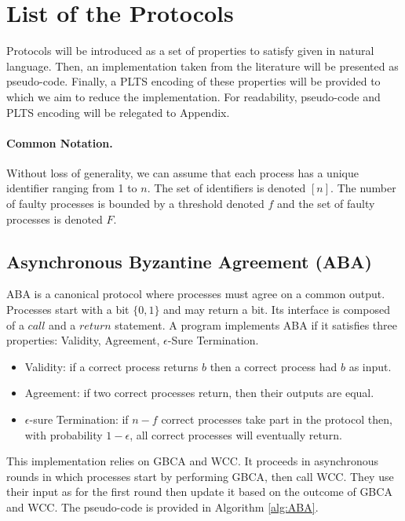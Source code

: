 \section{List of the Protocols}

Protocols will be introduced as a set of properties to
satisfy given in natural language. Then, an implementation
taken from the literature will be presented as pseudo-code. Finally, a PLTS
encoding of these properties will be provided to which we aim
to reduce the implementation. For readability, pseudo-code and PLTS encoding
will be relegated to Appendix.

\paragraph{Common Notation.}
Without loss of generality, we can assume that each process has a unique
identifier ranging from 1 to $n$. The set of identifiers is denoted $[n]$.
The number of faulty processes is bounded by a threshold denoted $f$ and
the set of faulty processes is denoted $F$.

\subsection{Asynchronous Byzantine Agreement (\textsf{ABA})}
\textsf{ABA} is a canonical protocol where processes must
agree on a common output.
Processes start with a bit $\{0,1\}$ and may return a bit.
Its interface is composed of a $call$ and a $return$ statement.
A program implements \textsf{ABA} if it satisfies three
properties: Validity, Agreement, $\epsilon$-Sure Termination.
\begin{itemize}
    \item Validity: if a correct process returns $b$ then a correct process had $b$ as input.
    \item Agreement: if two correct processes return, then their outputs are equal.
    \item $\epsilon$-sure Termination: if $n-f$ correct processes take part in the protocol then, with
    probability $1-\epsilon$, all correct processes will eventually return.
\end{itemize}

\begin{implementation}
    \label{impl:ABA}

    This implementation relies on \textsf{GBCA} and \textsf{WCC}. It proceeds
    in asynchronous rounds in which processes start by performing \textsf{GBCA},
    then call \textsf{WCC}. They use their input as for the first round then
    update it based on the outcome of \textsf{GBCA} and \textsf{WCC}. The
    pseudo-code is provided in Algorithm \ref{alg:ABA}.
\end{implementation}

